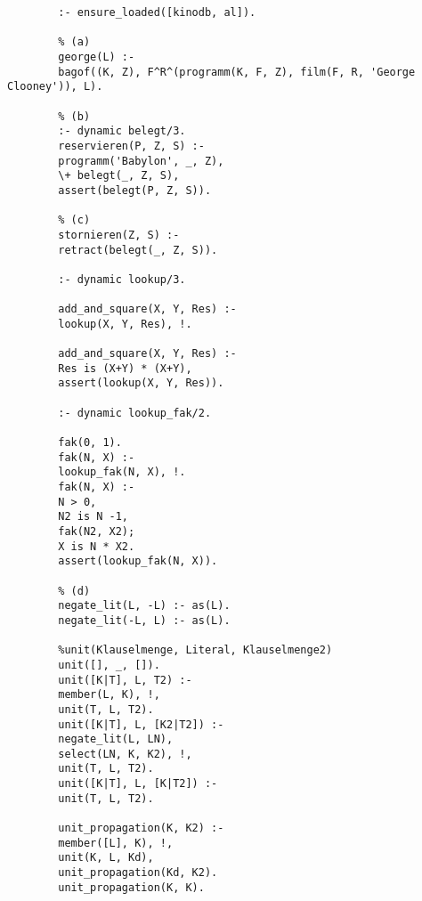 \documentclass[a4paper,10pt]{article}
\begin{document}
	\begin{verbatim}
		:- ensure_loaded([kinodb, al]).
		
		% (a)
		george(L) :-
		bagof((K, Z), F^R^(programm(K, F, Z), film(F, R, 'George Clooney')), L).
		
		% (b)
		:- dynamic belegt/3.
		reservieren(P, Z, S) :-
		programm('Babylon', _, Z),
		\+ belegt(_, Z, S),
		assert(belegt(P, Z, S)).
		
		% (c)
		stornieren(Z, S) :-
		retract(belegt(_, Z, S)).
		
		:- dynamic lookup/3.
		
		add_and_square(X, Y, Res) :-
		lookup(X, Y, Res), !.
		
		add_and_square(X, Y, Res) :-
		Res is (X+Y) * (X+Y),
		assert(lookup(X, Y, Res)).
		
		:- dynamic lookup_fak/2.
		
		fak(0, 1).
		fak(N, X) :-
		lookup_fak(N, X), !.
		fak(N, X) :-
		N > 0,
		N2 is N -1,
		fak(N2, X2);
		X is N * X2.
		assert(lookup_fak(N, X)).
		
		% (d)
		negate_lit(L, -L) :- as(L).
		negate_lit(-L, L) :- as(L).
		
		%unit(Klauselmenge, Literal, Klauselmenge2)
		unit([], _, []).
		unit([K|T], L, T2) :-
		member(L, K), !,
		unit(T, L, T2).
		unit([K|T], L, [K2|T2]) :-
		negate_lit(L, LN),
		select(LN, K, K2), !,
		unit(T, L, T2).
		unit([K|T], L, [K|T2]) :-
		unit(T, L, T2).
		
		unit_propagation(K, K2) :-
		member([L], K), !,
		unit(K, L, Kd),
		unit_propagation(Kd, K2).
		unit_propagation(K, K).

	\end{verbatim}
\end{document}
